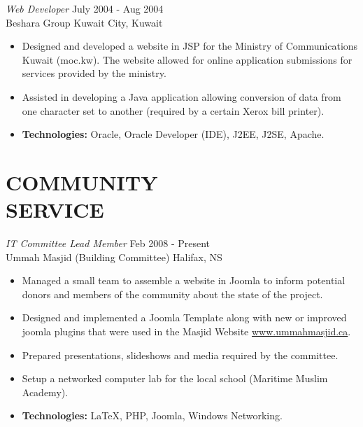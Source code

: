 \documentclass[line,margin]{res}
\begin{document}
\begin{resume}
    {\sl Web Developer} \hfill July 2004 - Aug 2004 \\
    Beshara Group \hfill Kuwait City, Kuwait
    \smallskip
        \begin{itemize}  \itemsep -2pt %
    \item Designed and developed a website in JSP for the Ministry of
        Communications Kuwait (moc.kw). The website allowed for online
        application submissions for services provided by the ministry.
    \item Assisted in developing a Java application allowing conversion of data
        from one character set to another (required by a certain Xerox bill
        printer).
    \item {\bf Technologies:} \hspace{3pt}
        Oracle, Oracle Developer (IDE), J2EE, J2SE, Apache.
        \end{itemize}

\section{COMMUNITY \\ SERVICE}
    {\sl IT Committee Lead Member} \hfill Feb 2008 - Present \\
    Ummah Masjid (Building Committee) \hfill Halifax, NS \smallskip
        \begin{itemize}  \itemsep -2pt %
    \item Managed a small team to assemble a website in Joomla to inform
    potential donors and members of the community about the state of the
    project.
    \item Designed and implemented a Joomla Template along with new or
    improved joomla plugins that were used in the Masjid Website
    \href{http://demo.ummahmasjid.org}{www.ummahmasjid.ca}.
    \item Prepared presentations, slideshows and media
    required by the committee.
    \item Setup a networked computer lab for the local school (Maritime
    Muslim Academy).
    \item {\bf Technologies:} \hspace{1pt}
        LaTeX, PHP, Joomla, Windows Networking.
        \end{itemize}


\end{resume}
\end{document}
